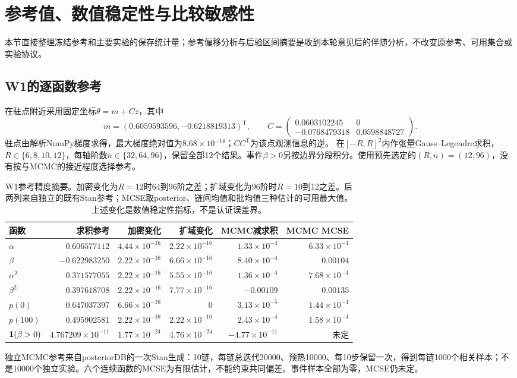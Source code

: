 \section{参考值、数值稳定性与比较敏感性}
\label{sec:reference-precision}
本节直接整理冻结参考和主要实验的保存统计量；参考偏移分析与后验区间摘要是收到本轮意见后的伴随分析，不改变原参考、可用集合或实验协议。
\subsection{W1的逐函数参考}
在驻点附近采用固定坐标$\theta=m+Cz$，其中
\[
m=(0.6059593596,-0.6218819313)^\mathsf T,\qquad
C=\begin{pmatrix}0.0603102245&0\\-0.0768479318&0.0598848727\end{pmatrix}.
\]
驻点由解析NumPy梯度求得，最大梯度绝对值为$8.68\times10^{-14}$；$CC^\mathsf T$为该点观测信息的逆。
在$[-R,R]^2$内作张量Gauss--Legendre求积，$R\in\{6,8,10,12\}$，每轴阶数$n\in\{32,64,96\}$，保留全部12个结果。事件$\beta>0$另按边界分段积分。使用预先选定的$(R,n)=(12,96)$，没有按与MCMC的接近程度选择参考。

\begin{table}[htbp]\centering\small
\begin{tabular}{lrrrrr}\toprule
函数 & 求积参考 & 加密变化 & 扩域变化 & MCMC减求积 & MCMC MCSE\\\midrule
$\alpha$ & $0.606577112$ & $4.44\times10^{-16}$ & $2.22\times10^{-16}$ & $1.33\times10^{-4}$ & $6.33\times10^{-4}$\\
$\beta$ & $-0.622983250$ & $2.22\times10^{-16}$ & $6.66\times10^{-16}$ & $8.40\times10^{-4}$ & $0.00104$\\
$\alpha^2$ & $0.371577055$ & $2.22\times10^{-16}$ & $5.55\times10^{-16}$ & $1.36\times10^{-4}$ & $7.68\times10^{-4}$\\
$\beta^2$ & $0.397618708$ & $2.22\times10^{-16}$ & $7.77\times10^{-16}$ & $-0.00109$ & $0.00135$\\
$p(0)$ & $0.647037397$ & $6.66\times10^{-16}$ & $0$ & $3.13\times10^{-5}$ & $1.44\times10^{-4}$\\
$p(100)$ & $0.495902581$ & $2.22\times10^{-16}$ & $2.22\times10^{-16}$ & $2.43\times10^{-4}$ & $1.58\times10^{-4}$\\
$\mathbf{1}(\beta>0)$ & $4.767209\times10^{-11}$ & $1.77\times10^{-24}$ & $4.76\times10^{-24}$ & $-4.77\times10^{-11}$ & 未定\\
\bottomrule\end{tabular}
\caption{W1参考精度摘要。加密变化为$R=12$时64到96阶之差；扩域变化为96阶时$R=10$到12之差。后两列来自独立的既有Stan参考；MCSE取posterior、链间均值和批均值三种估计的可用最大值。上述变化是数值稳定性指标，不是认证误差界。}
\label{tab:reference-wells}
\end{table}
独立MCMC参考来自posteriorDB的一次Stan生成：10链，每链总迭代20000、预热10000、每10步保留一次，得到每链1000个相关样本；不是10000个独立实验。六个连续函数的MCSE为有限估计，不能约束共同偏差。事件样本全部为零，MCSE仍未定。

